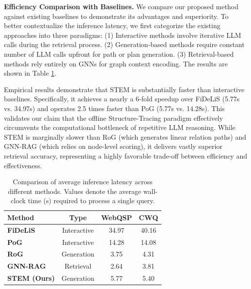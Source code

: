 \documentclass[11pt]{article}
\begin{document}
\textbf{Efficiency Comparison with Baselines.} We compare our proposed method against existing baselines to demonstrate its advantages and superiority. To better contextualize the inference latency, we first categorize the existing approaches into three paradigms: (1) Interactive methods involve iterative LLM calls during the retrieval process. (2) Generation-based methods require constant number of LLM calls upfront for path or plan generation. (3) Retrieval-based methods rely entirely on GNNs for graph context encoding. The results are shown in Table \ref{tab:baseline_eff}.

Empirical results demonstrate that STEM is substantially faster than interactive baselines. Specifically, it achieves a nearly a 6-fold speedup over FiDeLiS (5.77s vs. 34.97s) and operates 2.5 times faster than PoG (5.77s vs. 14.28s). This validates our claim that the offline Structure-Tracing paradigm effectively circumvents the computational bottleneck of repetitive LLM reasoning. While STEM is marginally slower than RoG (which generates linear relation paths) and GNN-RAG (which relies on node-level scoring), it delivers vastly superior retrieval accuracy, representing a highly favorable trade-off between efficiency and effectiveness.

\begin{table}[t]
\footnotesize
\centering
\renewcommand{\arraystretch}{1.15}
\setlength{\tabcolsep}{3.5pt} 

\begin{tabular}{l|c|c|c}
\toprule
\hline
{\textbf{Method}} & \textbf{Type} & {\textbf{WebQSP}} & {\textbf{CWQ}} \\

\hline
\textbf{FiDeLiS} & Interactive	 &  34.97	 &  40.16 \\
\textbf{PoG} & Interactive & 14.28 & 14.08 \\
\textbf{RoG} & 	Generation &	3.75	& 4.31 \\
\textbf{GNN-RAG} & 	Retrieval	& 2.64	& 3.81 \\
\textbf{STEM (Ours)}	& Generation	& 5.77	& 5.40 \\
\hline
\bottomrule
\end{tabular}
\caption{Comparison of average inference latency across different methods. Values denote the average wall-clock time (s) required to process a single query.}
\label{tab:baseline_eff}
\end{table}

\renewcommand{\algorithmicrequire}{\textbf{Input:}}
\renewcommand{\algorithmicensure}{\textbf{Output:}}
\end{document}
